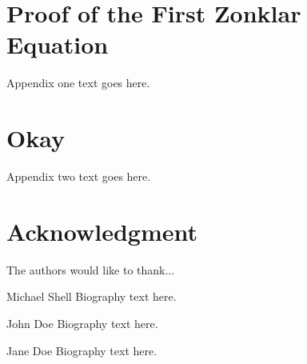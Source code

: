 \documentclass[journal,comsoc]{IEEEtran}
\begin{document}
\appendices
\section{Proof of the First Zonklar Equation}
Appendix one text goes here.

\section{Okay}
Appendix two text goes here.


\section*{Acknowledgment}


The authors would like to thank...

\ifCLASSOPTIONcaptionsoff
  \newpage
\fi



\begin{IEEEbiography}{Michael Shell}
Biography text here.
\end{IEEEbiography}

\begin{IEEEbiographynophoto}{John Doe}
Biography text here.
\end{IEEEbiographynophoto}


\begin{IEEEbiographynophoto}{Jane Doe}
Biography text here.
\end{IEEEbiographynophoto}
\end{document}
